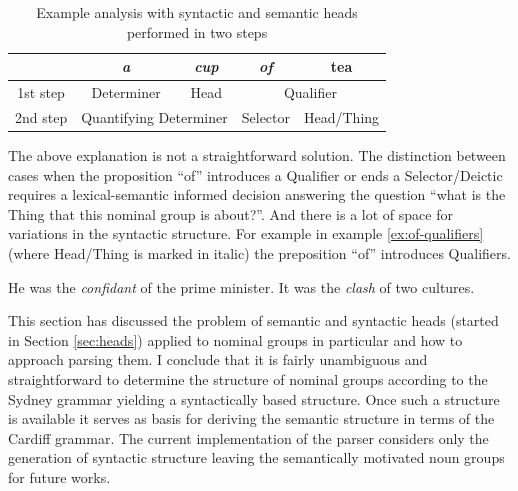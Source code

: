     \begin{table}[!ht]
        \centering
        \begin{tabular}{c|c|c|c|c|}
        \cline{2-5}
         & \textit{a} & \textit{cup} & \textit{of} & tea \\ \hline
        \multicolumn{1}{|c|}{1st step} & Determiner & Head & \multicolumn{2}{c|}{Qualifier} \\ \hline
        \multicolumn{1}{|c|}{2nd step} & \multicolumn{2}{c|}{Quantifying Determiner} & Selector & Head/Thing \\ \hline
        \end{tabular}
        \caption{Example analysis with syntactic and semantic heads performed in two steps}
        \label{tab:exmaple-analisys-parsing-syn-sem-heads}
    \end{table}
    
    The above explanation is not a straightforward solution. The distinction between cases when the proposition ``of'' introduces a Qualifier or ends a Selector/Deictic requires a lexical-semantic informed decision answering the question ``what is the Thing that this nominal group is about?''. And there is a lot of space for variations in the syntactic structure. For example in example \ref{ex:of-qualifiers} (where Head/Thing is marked in italic) the preposition ``of'' introduces Qualifiers.
     
     \begin{exe}
        \ex \label{ex:of-qualifiers}He was the \textit{confidant} of the prime minister.
        \ex It was the \textit{clash} of two cultures.
    \end{exe}
    
    This section has discussed the problem of semantic and syntactic heads (started in Section \ref{sec:heads}) applied to nominal groups in particular and how to approach parsing them. I conclude that it is fairly unambiguous and straightforward to determine the structure of nominal groups according to the Sydney grammar yielding a syntactically based structure. Once such a structure is available it serves as basis for deriving the semantic structure in terms of the Cardiff grammar. The current implementation of the parser considers only the generation of syntactic structure leaving the semantically motivated noun groups for future works.
    
	
